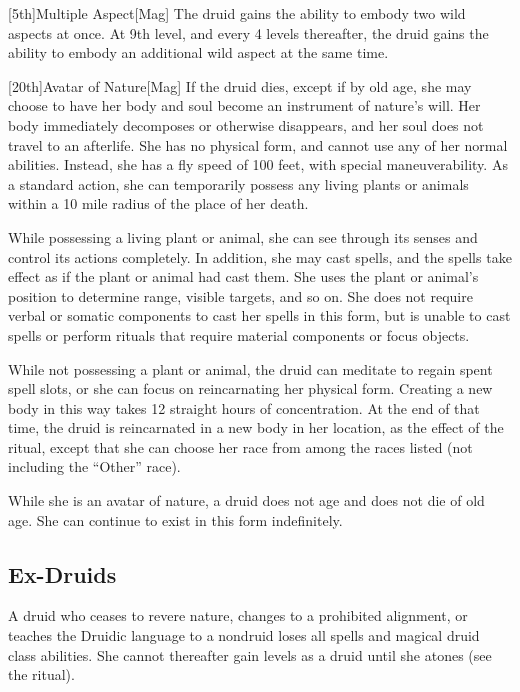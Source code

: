         [5th]{Multiple Aspect}[Mag]
        The druid gains the ability to embody two wild aspects at once.
        At 9th level, and every 4 levels thereafter, the druid gains the ability to embody an additional wild aspect at the same time.

    [20th]{Avatar of Nature}[Mag]
    If the druid dies, except if by old age, she may choose to have her body and soul become an instrument of nature's will.
    Her body immediately decomposes or otherwise disappears, and her soul does not travel to an afterlife.
    She has no physical form, and cannot use any of her normal abilities.
    Instead, she has a fly speed of 100 feet, with special maneuverability.
    As a standard action, she can temporarily possess any living plants or animals within a 10 mile radius of the place of her death.

    While possessing a living plant or animal, she can see through its senses and control its actions completely.
    In addition, she may cast spells, and the spells take effect as if the plant or animal had cast them.
    She uses the plant or animal's position to determine range, visible targets, and so on.
    She does not require verbal or somatic components to cast her spells in this form, but is unable to cast spells or perform rituals that require material components or focus objects.

    While not possessing a plant or animal, the druid can meditate to regain spent spell slots, or she can focus on reincarnating her physical form.
    Creating a new body in this way takes 12 straight hours of concentration.
    At the end of that time, the druid is reincarnated in a new body in her location, as the effect of the  ritual, except that she can choose her race from among the races listed (not including the ``Other'' race).

    While she is an avatar of nature, a druid does not age and does not die of old age.
    She can continue to exist in this form indefinitely.

    \subsection{Ex-Druids}
        A druid who ceases to revere nature, changes to a prohibited alignment, or teaches the Druidic language to a nondruid loses all spells and magical druid class abilities.
        She cannot thereafter gain levels as a druid until she atones (see the  ritual).

